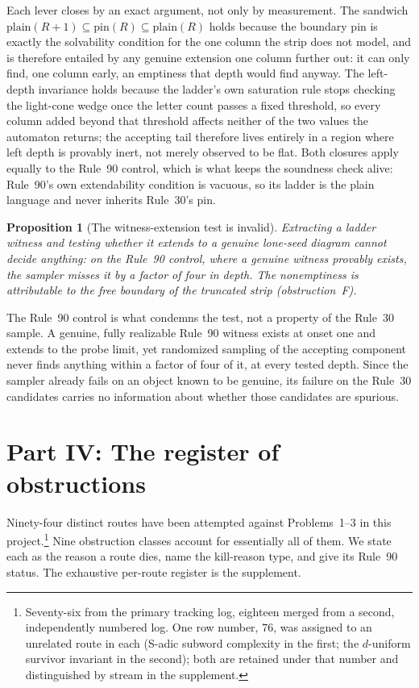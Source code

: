 \documentclass[11pt]{article}
\newtheorem{proposition}[theorem]{Proposition}
\theoremstyle{definition}
\begin{document}
Each lever closes by an exact argument, not only by measurement. The sandwich
$\mathrm{plain}(R+1)\subseteq\mathrm{pin}(R)\subseteq\mathrm{plain}(R)$ holds
because the boundary pin is exactly the solvability condition for the one
column the strip does not model, and is therefore entailed by any genuine
extension one column further out: it can only find, one column early, an
emptiness that depth would find anyway. The left-depth invariance holds
because the ladder's own saturation rule stops checking the light-cone wedge
once the letter count passes a fixed threshold, so every column added beyond
that threshold affects neither of the two values the automaton returns; the
accepting tail therefore lives entirely in a region where left depth is
provably inert, not merely observed to be flat. Both closures apply equally to
the Rule~90 control, which is what keeps the soundness check alive: Rule~90's
own extendability condition is vacuous, so its ladder is the plain language and
never inherits Rule~30's pin.

\begin{proposition}[The witness-extension test is invalid]\label{prop:witness}
Extracting a ladder witness and testing whether it extends to a genuine
lone-seed diagram cannot decide anything: on the Rule~90 control, where a genuine
witness provably exists, the sampler misses it by a factor of four in depth. The
nonemptiness is attributable to the free boundary of the truncated strip
(obstruction~F).
\end{proposition}

The Rule~90 control is what condemns the test, not a property of the Rule~30
sample. A genuine, fully realizable Rule~90 witness exists at onset one and
extends to the probe limit, yet randomized sampling of the accepting
component never finds anything within a factor of four of it, at every tested
depth. Since the sampler already fails on an object known to be genuine, its
failure on the Rule~30 candidates carries no information about whether those
candidates are spurious.

\section{Part IV: The register of obstructions}
\label{sec:register}

Ninety-four distinct routes have been attempted against
Problems~1--3 in this project.\footnote{Seventy-six from the primary tracking
log, eighteen merged from a second, independently numbered log. One row
number, 76, was assigned to an unrelated route in each (S-adic subword
complexity in the first; the $d$-uniform survivor invariant in the second);
both are retained under that number and distinguished by stream in the
supplement.} Nine obstruction classes account for essentially
all of them. We state each as the reason a route dies, name the kill-reason type,
and give its Rule~90 status. The exhaustive per-route register is the supplement.
\end{document}
